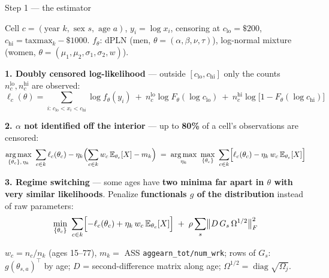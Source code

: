 \documentclass[10pt,aspectratio=169]{beamer}
\newcommand{\LOWC}{c_{\text{lo}}}
\newcommand{\HIGHC}{c_{\text{hi}}}
\begin{document}
\begin{frame}{Step 1 --- the estimator}
  \small
  {\footnotesize Cell $c=(\text{year }k,\text{ sex }s,\text{ age }a)$, $y_i=\log x_i$, censoring
  at $\LOWC=\$200$, $\HIGHC=\text{taxmax}_k-\$1000$. $f_\theta$: dPLN (men,
  $\theta=(\alpha,\beta,\nu,\tau)$), log-normal mixture (women,
  $\theta=(\mu_1,\mu_2,\sigma_1,\sigma_2,w)$).\par}

  \smallskip
  \textbf{1. Doubly censored log-likelihood} --- outside $[\LOWC,\HIGHC]$ only the counts
  $n^{\text{lo}}_c,n^{\text{hi}}_c$ are observed:
  \vspace{-5pt}
  \[
    \ell_c(\theta)=\!\!\sum_{i:\,\LOWC<x_i<\HIGHC}\!\!\log f_\theta(y_i)
      \ +\ n^{\text{lo}}_c\log F_\theta(\log\LOWC)
      \ +\ n^{\text{hi}}_c\log\bigl[1-F_\theta(\log\HIGHC)\bigr]
  \]
  \vspace{-13pt}

  \textbf{2. $\alpha$ not identified off the interior} --- up to \textbf{80\%} of a cell's
  observations are censored:
  \vspace{-5pt}
  \[
    \operatorname*{arg\,max}_{\{\theta_c\},\,\eta_k}\ \sum_{c\in k}\ell_c(\theta_c)
      -\eta_k\Bigl(\sum_{c\in k}w_c\,\mathbb{E}_{\theta_c}[X]-m_k\Bigr)
    \;=\;
    \operatorname*{arg\,max}_{\eta_k}\ \max_{\{\theta_c\}}\
      \sum_{c\in k}\Bigl[\ell_c(\theta_c)-\eta_k\,w_c\,\mathbb{E}_{\theta_c}[X]\Bigr]
  \]
  \vspace{-13pt}

  \textbf{3. Regime switching} --- some ages have \textbf{two minima far apart in $\theta$ with
  very similar likelihoods}. Penalize \textbf{functionals $g$ of the distribution} instead of
  raw parameters:
  \vspace{-4pt}
  \[
    \min_{\{\theta_c\}}\ \sum_{c\in k}\Bigl[-\ell_c(\theta_c)
      +\eta_k\,w_c\,\mathbb{E}_{\theta_c}[X]\Bigr]
      \;+\;\rho\sum_{s}\bigl\|D\,G_s\,\Omega^{1/2}\bigr\|_F^2
  \]
  \vspace{-11pt}

  {\footnotesize $w_c=n_c/n_k$ (ages 15--77), $m_k=$ ASS \texttt{aggearn\_tot/num\_wrk};
  rows of $G_s$: $g(\theta_{s,a})^{\top}$ by age; $D$ = second-difference matrix along age;
  $\Omega^{1/2}=\operatorname{diag}\sqrt{\Omega_j}$.\par}
\end{frame}
\end{document}
